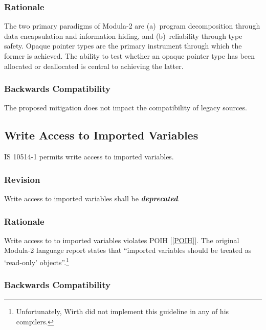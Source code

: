 \documentclass[10pt,a4paper,leqno,fleqn]{article}
\renewcommand{\emph}[1]{\textbf{\textit{#1}}}
\begin{document}
\subsubsection{Rationale}
The two primary paradigms of Modula-2 are (a)~program decomposition through
data encapsulation and information hiding, and (b)~reliability through type
safety. Opaque pointer types are the primary instrument through which the
former is achieved. The ability to test whether an opaque pointer type has
been allocated or deallocated is central to achieving the latter.

\subsubsection{Backwards Compatibility}

The proposed mitigation does not impact the compatibility of legacy sources.


\subsection{Write Access to Imported Variables}

IS 10514-1 permits write access to imported variables.

\subsubsection{Revision}

Write access to imported variables shall be \emph{deprecated}. 

\subsubsection{Rationale}

Write access to to imported variables violates POIH [\ref{POIH}]. The
original Modula-2 language report \cite[p.88]{Wirth88} states that
``imported variables should be treated as `read-only' objects''.\footnote
{Unfortunately, Wirth did not implement this guideline in any of his compilers.}

\subsubsection{Backwards Compatibility}
\end{document}
